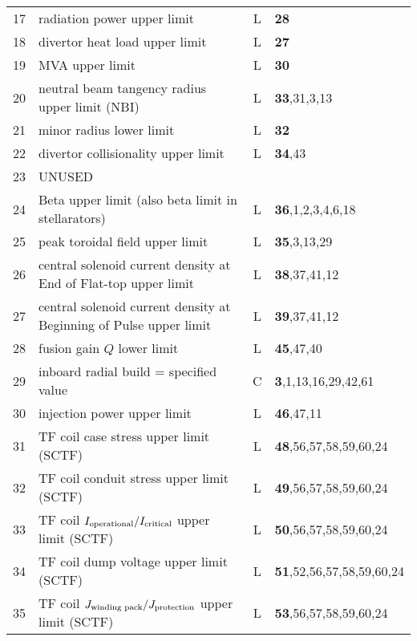 \documentclass[11pt,a4paper]{report}
\begin{document}
\begin{table}[tbph]
\begin{center}
\begin{tabular}{||c|l|c|l||}
17  & radiation power upper limit                               & L    & \textbf{28} \\
18  & divertor heat load upper limit                            & L    & \textbf{27} \\
19  & MVA upper limit                                           & L    & \textbf{30} \\
20  & neutral beam tangency radius upper limit (NBI)            & L    & \textbf{33},31,3,13 \\
21  & minor radius lower limit                                  & L    & \textbf{32} \\
22  & divertor collisionality upper limit                       & L    & \textbf{34},43 \\
23  & UNUSED                                                    &      & \\
24  & Beta upper limit (also beta limit in stellarators)        & L    & \textbf{36},1,2,3,4,6,18 \\
25  & peak toroidal field upper limit                           & L    & \textbf{35},3,13,29 \\
26  & central solenoid current density at End of Flat-top upper limit    & L    & \textbf{38},37,41,12 \\
27  & central solenoid current density at Beginning of Pulse upper limit & L    & \textbf{39},37,41,12 \\
28  & fusion gain $Q$ lower limit                               & L    & \textbf{45},47,40 \\
29  & inboard radial build = specified value                    & C    & \textbf{3},1,13,16,29,42,61 \\
30  & injection power upper limit                               & L    & \textbf{46},47,11 \\
31  & TF coil case stress upper limit (SCTF)                    & L    & \textbf{48},56,57,58,59,60,24 \\
32  & TF coil conduit stress upper limit (SCTF)                 & L    & \textbf{49},56,57,58,59,60,24 \\
33  & TF coil $I_{\mbox{\scriptsize operational}}/
I_{\mbox{\scriptsize critical}}$ upper limit (SCTF)                    & L    & \textbf{50},56,57,58,59,60,24 \\
34  & TF coil dump voltage upper limit (SCTF)                   & L    & \textbf{51},52,56,57,58,59,60,24 \\
35  & TF coil $J_{\mbox{\scriptsize winding pack}}/
J_{\mbox{\scriptsize protection}}$ upper limit (SCTF)                   & L    & \textbf{53},56,57,58,59,60,24 \\

\end{tabular}
\end{center}
\end{table}
\end{document}
